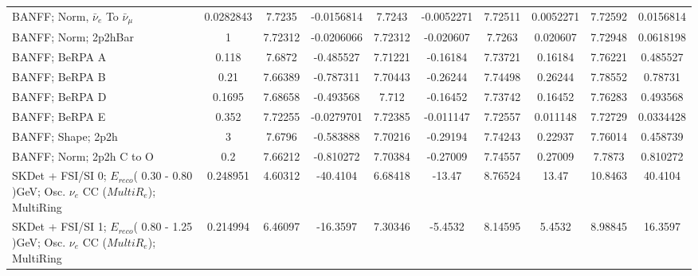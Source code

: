 \begin{tabular}{| l | S | S  S | S  S | S  S | S  S | }
                               BANFF; Norm, $\bar{\nu}_{e}$ To $\bar{\nu}_{\mu}$ &       0.0282843 &          7.7235 &      -0.0156814 &          7.7243 &      -0.0052271 &         7.72511 &       0.0052271 &         7.72592 &       0.0156814 \\ 
                                                            BANFF; Norm; 2p2hBar &               1 &         7.72312 &      -0.0206066 &         7.72312 &       -0.020607 &          7.7263 &        0.020607 &         7.72948 &       0.0618198 \\ 
                                                                  BANFF; BeRPA A &           0.118 &          7.6872 &       -0.485527 &         7.71221 &        -0.16184 &         7.73721 &         0.16184 &         7.76221 &        0.485527 \\ 
                                                                  BANFF; BeRPA B &            0.21 &         7.66389 &       -0.787311 &         7.70443 &        -0.26244 &         7.74498 &         0.26244 &         7.78552 &         0.78731 \\ 
                                                                  BANFF; BeRPA D &          0.1695 &         7.68658 &       -0.493568 &           7.712 &        -0.16452 &         7.73742 &         0.16452 &         7.76283 &        0.493568 \\ 
                                                                  BANFF; BeRPA E &           0.352 &         7.72255 &      -0.0279701 &         7.72385 &       -0.011147 &         7.72557 &        0.011148 &         7.72729 &       0.0334428 \\ 
                                                              BANFF; Shape; 2p2h &               3 &          7.6796 &       -0.583888 &         7.70216 &        -0.29194 &         7.74243 &         0.22937 &         7.76014 &        0.458739 \\ 
                                                        BANFF; Norm; 2p2h C to O &             0.2 &         7.66212 &       -0.810272 &         7.70384 &        -0.27009 &         7.74557 &         0.27009 &          7.7873 &        0.810272 \\ 
SKDet + FSI/SI  0; $E_{reco}$( 0.30 - 0.80 )GeV; Osc. $\nu_{e}$ CC ($MultiR_{e}$); MultiRing &        0.248951 &         4.60312 &        -40.4104 &         6.68418 &          -13.47 &         8.76524 &           13.47 &         10.8463 &         40.4104 \\ 
SKDet + FSI/SI  1; $E_{reco}$( 0.80 - 1.25 )GeV; Osc. $\nu_{e}$ CC ($MultiR_{e}$); MultiRing &        0.214994 &         6.46097 &        -16.3597 &         7.30346 &         -5.4532 &         8.14595 &          5.4532 &         8.98845 &         16.3597 \\ 

\end{tabular}
